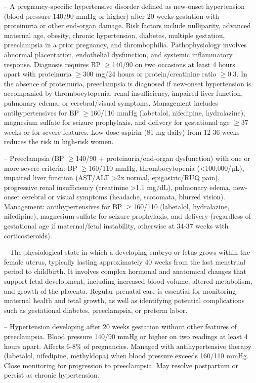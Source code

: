 -- A pregnancy-specific hypertensive disorder defined as new-onset hypertension (blood pressure 140/90 mmHg or higher) after 20 weeks gestation with proteinuria or other end-organ damage. Risk factors include nulliparity, advanced maternal age, obesity, chronic hypertension, diabetes, multiple gestation, preeclampsia in a prior pregnancy, and thrombophilia. Pathophysiology involves abnormal placentation, endothelial dysfunction, and systemic inflammatory response. Diagnosis requires BP \(\ge\)140/90 on two occasions at least 4 hours apart with proteinuria \(\ge\)300 mg/24 hours or protein/creatinine ratio \(\ge\)0.3. In the absence of proteinuria, preeclampsia is diagnosed if new-onset hypertension is accompanied by thrombocytopenia, renal insufficiency, impaired liver function, pulmonary edema, or cerebral/visual symptoms. Management includes antihypertensives for BP \(\ge\)160/110 mmHg (labetalol, nifedipine, hydralazine), magnesium sulfate for seizure prophylaxis, and delivery for gestational age \(\ge\)37 weeks or for severe features. Low-dose aspirin (81 mg daily) from 12-36 weeks reduces the risk in high-risk women.

-- Preeclampsia (BP \(\ge\)140/90 + proteinuria/end-organ dysfunction) with one or more severe criteria: BP \(\ge\)160/110 mmHg, thrombocytopenia (<100,000/µL), impaired liver function (AST/ALT >2x normal, epigastric/RUQ pain), progressive renal insufficiency (creatinine >1.1 mg/dL), pulmonary edema, new-onset cerebral or visual symptoms (headache, scotomata, blurred vision). Management: antihypertensives for BP \(\ge\)160/110 (labetalol, hydralazine, nifedipine), magnesium sulfate for seizure prophylaxis, and delivery (regardless of gestational age if maternal/fetal instability, otherwise at 34-37 weeks with corticosteroids).

-- The physiological state in which a developing embryo or fetus grows within the female uterus, typically lasting approximately 40 weeks from the last menstrual period to childbirth. It involves complex hormonal and anatomical changes that support fetal development, including increased blood volume, altered metabolism, and growth of the placenta. Regular prenatal care is essential for monitoring maternal health and fetal growth, as well as identifying potential complications such as gestational diabetes, preeclampsia, or preterm labor.

-- Hypertension developing after 20 weeks gestation without other features of preeclampsia. Blood pressure 140/90 mmHg or higher on two readings at least 4 hours apart. Affects 6-8\% of pregnancies. Managed with antihypertensive therapy (labetalol, nifedipine, methyldopa) when blood pressure exceeds 160/110 mmHg. Close monitoring for progression to preeclampsia. May resolve postpartum or persist as chronic hypertension.

